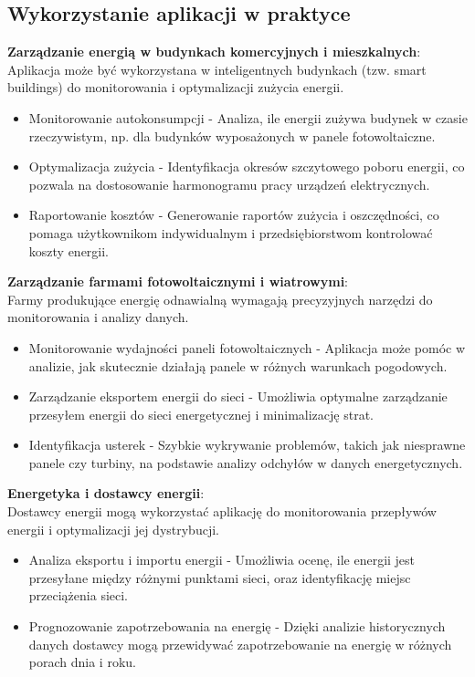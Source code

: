 \subsection{Wykorzystanie aplikacji w praktyce}
\textbf{Zarządzanie energią w budynkach komercyjnych i mieszkalnych}: \\
Aplikacja może być wykorzystana w inteligentnych budynkach (tzw. smart buildings) do monitorowania i optymalizacji zużycia energii.
\begin{itemize}
    \item Monitorowanie autokonsumpcji - Analiza, ile energii zużywa budynek w czasie rzeczywistym, np. dla budynków wyposażonych w panele fotowoltaiczne.
    \item Optymalizacja zużycia - Identyfikacja okresów szczytowego poboru energii, co pozwala na dostosowanie harmonogramu pracy urządzeń elektrycznych.
    \item Raportowanie kosztów - Generowanie raportów zużycia i oszczędności, co pomaga użytkownikom indywidualnym i przedsiębiorstwom kontrolować koszty energii.
\end{itemize}
\textbf{Zarządzanie farmami fotowoltaicznymi i wiatrowymi}: \\
Farmy produkujące energię odnawialną wymagają precyzyjnych narzędzi do monitorowania i analizy danych.
\begin{itemize}
    \item Monitorowanie wydajności paneli fotowoltaicznych - Aplikacja może pomóc w analizie, jak skutecznie działają panele w różnych warunkach pogodowych.
    \item Zarządzanie eksportem energii do sieci - Umożliwia optymalne zarządzanie przesyłem energii do sieci energetycznej i minimalizację strat.
    \item Identyfikacja usterek - Szybkie wykrywanie problemów, takich jak niesprawne panele czy turbiny, na podstawie analizy odchyłów w danych energetycznych.
\end{itemize}
\textbf{Energetyka i dostawcy energii}: \\
Dostawcy energii mogą wykorzystać aplikację do monitorowania przepływów energii i optymalizacji jej dystrybucji. 
\begin{itemize}
    \item Analiza eksportu i importu energii - Umożliwia ocenę, ile energii jest przesyłane między różnymi punktami sieci, oraz identyfikację miejsc przeciążenia sieci.
    \item Prognozowanie zapotrzebowania na energię - Dzięki analizie historycznych danych dostawcy mogą przewidywać zapotrzebowanie na energię w różnych porach dnia i roku.
\end{itemize}
\newpage
